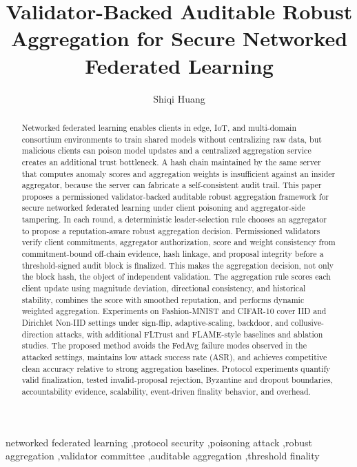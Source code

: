\documentclass[preprint,12pt]{elsarticle}
\begin{document}
\begin{frontmatter}

\title{Validator-Backed Auditable Robust Aggregation for Secure Networked Federated Learning}

\author[aff1]{Shiqi Huang}
\address[aff1]{Faculty of Computational Mathematics and Cybernetics, Lomonosov Moscow State University, Moscow, Russia}

\begin{abstract}
Networked federated learning enables clients in edge, IoT, and multi-domain consortium environments to train shared models without centralizing raw data, but malicious clients can poison model updates and a centralized aggregation service creates an additional trust bottleneck. A hash chain maintained by the same server that computes anomaly scores and aggregation weights is insufficient against an insider aggregator, because the server can fabricate a self-consistent audit trail. This paper proposes a permissioned validator-backed auditable robust aggregation framework for secure networked federated learning under client poisoning and aggregator-side tampering. In each round, a deterministic leader-selection rule chooses an aggregator to propose a reputation-aware robust aggregation decision. Permissioned validators verify client commitments, aggregator authorization, score and weight consistency from commitment-bound off-chain evidence, hash linkage, and proposal integrity before a threshold-signed audit block is finalized. This makes the aggregation decision, not only the block hash, the object of independent validation. The aggregation rule scores each client update using magnitude deviation, directional consistency, and historical stability, combines the score with smoothed reputation, and performs dynamic weighted aggregation. Experiments on Fashion-MNIST and CIFAR-10 cover IID and Dirichlet Non-IID settings under sign-flip, adaptive-scaling, backdoor, and collusive-direction attacks, with additional FLTrust and FLAME-style baselines and ablation studies. The proposed method avoids the FedAvg failure modes observed in the attacked settings, maintains low attack success rate (ASR), and achieves competitive clean accuracy relative to strong aggregation baselines. Protocol experiments quantify valid finalization, tested invalid-proposal rejection, Byzantine and dropout boundaries, accountability evidence, scalability, event-driven finality behavior, and overhead.
\end{abstract}

\begin{keyword}
networked federated learning \sep protocol security \sep poisoning attack \sep robust aggregation \sep validator committee \sep auditable aggregation \sep threshold finality
\end{keyword}

\end{frontmatter}
\end{document}
